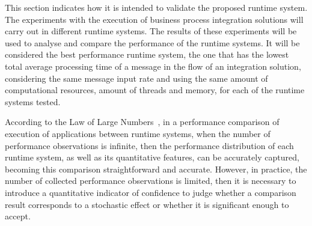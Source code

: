 \label{cap:validation}
\noindent 
This section indicates how it is intended to validate the proposed runtime system. The experiments with the execution of business process integration solutions will carry out in different runtime systems. The results of these experiments will be used to analyse and compare the performance of the runtime systems. It will be considered the best performance runtime system, the one that has the lowest total average processing time of a message in the flow of an integration solution, considering the same message input rate and using the same amount of computational resources, amount of threads and memory, for each of the runtime systems tested.

According to the Law of Large Numbers~\cite{hoeffding1961}, in a performance comparison of execution of applications between runtime systems, when the number of performance observations is infinite, then the performance distribution of each runtime system, as well as its quantitative features, can be accurately captured, becoming this comparison straightforward and accurate. However, in practice, the number of collected performance observations is limited, then it is necessary to introduce a quantitative indicator of confidence to judge whether a comparison result corresponds to a stochastic effect or whether it is significant enough to accept.

